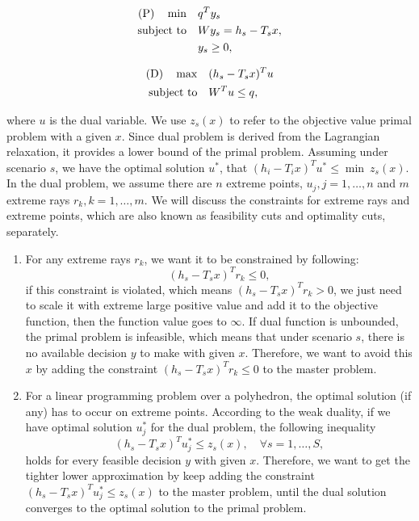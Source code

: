 \documentclass[preprint,review,11pt,authoryear]{elsarticle}
\begin{document}
\vspace{-3em}
\begin{multicols}{2}
    \begin{align*}
        \text{(P)} \quad  \min \quad & q^T y_s \\
                    \operatorname{subject~to} \quad & Wy_s = h_s - T_s x, \\
                                     &  y_s \geq 0,
    \end{align*}
    \columnbreak
    
    \begin{align*}
        \text{(D)} \quad \max \quad & (h_s - T_s x)^T u \\
                   \operatorname{subject~to} \quad & W^T u \leq q,
    \end{align*}
\end{multicols}
\vspace{-3em}
where $u$ is the dual variable. We use $z_s(x)$ to refer to the objective value primal problem with a given $x$. Since dual problem is derived from the Lagrangian relaxation, it  provides a lower bound of the primal problem. Assuming under scenario $s$, we have the optimal solution $u^*$, that $(h_i - T_i x)^T u^* \leq \min ~z_s(x)$. 
In the dual problem, we assume there are $n$ extreme points, $u_j, j = 1,\dots,n$ and $m$ extreme rays $r_k, k = 1,\dots,m$. We will discuss the constraints for extreme rays and extreme points, which are also known as feasibility cuts and optimality cuts, separately.
\begin{enumerate}
    \item[1.] For any extreme rays $r_k$, we want it to be constrained by following:
        \begin{equation*}
            (h_s - T_s x)^T r_k \leq 0,
        \end{equation*}
        if this constraint is violated, which means $(h_s - T_s x)^T r_k > 0$, we just need to scale it with extreme large positive value and add it to the objective function, then the function value goes to $\infty$. If dual function is unbounded, the primal problem is infeasible, which means that under scenario $s$, there is no available decision $y$ to make with given $x$. Therefore, we want to avoid this $x$ by adding the constraint $(h_s - T_s x)^T r_k \leq 0$ to the master problem.
        
    \item[2.] For a linear programming problem over a polyhedron, the optimal solution (if any) has to occur on extreme points. According to the weak duality, if we have optimal solution $u^*_j$ for the dual problem, the following inequality
        \begin{equation*}
            (h_s - T_s x)^T u^*_j \leq z_s(x), \quad \forall s = 1,\dots,S,
        \end{equation*}
        holds for every feasible decision $y$ with given $x$. Therefore, we want to get the tighter lower approximation by keep adding the constraint $(h_s - T_s x)^T u^*_j \leq z_s(x)$ to the master problem, until the dual solution converges to the optimal solution to the primal problem.
\end{enumerate}
\end{document}
